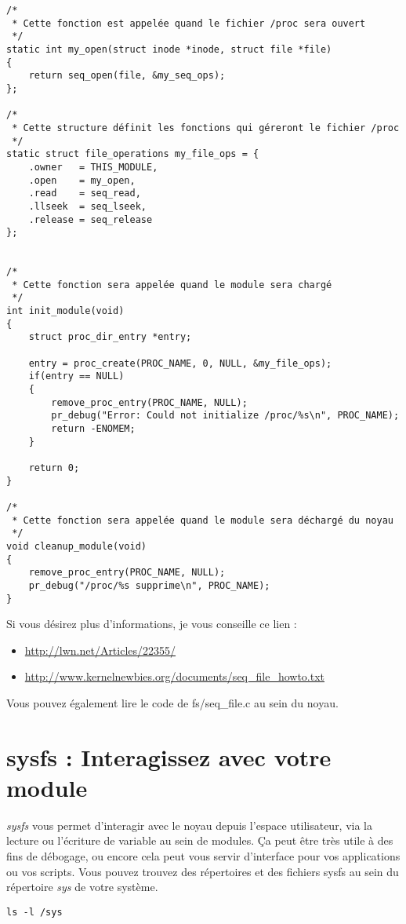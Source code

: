 \documentclass[11pt]{article}
\begin{document}
\begin{verbatim}
/*
 * Cette fonction est appelée quand le fichier /proc sera ouvert
 */
static int my_open(struct inode *inode, struct file *file)
{
    return seq_open(file, &my_seq_ops);
};

/*
 * Cette structure définit les fonctions qui géreront le fichier /proc
 */
static struct file_operations my_file_ops = {
    .owner   = THIS_MODULE,
    .open    = my_open,
    .read    = seq_read,
    .llseek  = seq_lseek,
    .release = seq_release
};


/*
 * Cette fonction sera appelée quand le module sera chargé
 */
int init_module(void)
{
    struct proc_dir_entry *entry;

    entry = proc_create(PROC_NAME, 0, NULL, &my_file_ops);
    if(entry == NULL)
    {
        remove_proc_entry(PROC_NAME, NULL);
        pr_debug("Error: Could not initialize /proc/%s\n", PROC_NAME);
        return -ENOMEM;
    }

    return 0;
}

/*
 * Cette fonction sera appelée quand le module sera déchargé du noyau
 */
void cleanup_module(void)
{
    remove_proc_entry(PROC_NAME, NULL);
    pr_debug("/proc/%s supprime\n", PROC_NAME);
}
\end{verbatim}

Si vous désirez plus d'informations, je vous conseille ce lien :

\begin{itemize}
\item \url{http://lwn.net/Articles/22355/}

\item \url{http://www.kernelnewbies.org/documents/seq_file_howto.txt}
\end{itemize}

Vous pouvez également lire le code de fs/seq\_file.c au sein du noyau.

\section*{sysfs : Interagissez avec votre module}
\label{sec-8}

\emph{sysfs} vous permet d'interagir avec le noyau depuis l'espace utilisateur, via la lecture ou l'écriture de variable au sein de modules. Ça peut être très utile à des fins de débogage, ou encore cela peut vous servir d'interface pour vos applications ou vos scripts. Vous pouvez trouvez des répertoires et des fichiers sysfs au sein du répertoire \emph{sys} de votre système.

\begin{verbatim}
ls -l /sys
\end{verbatim}
\end{document}
